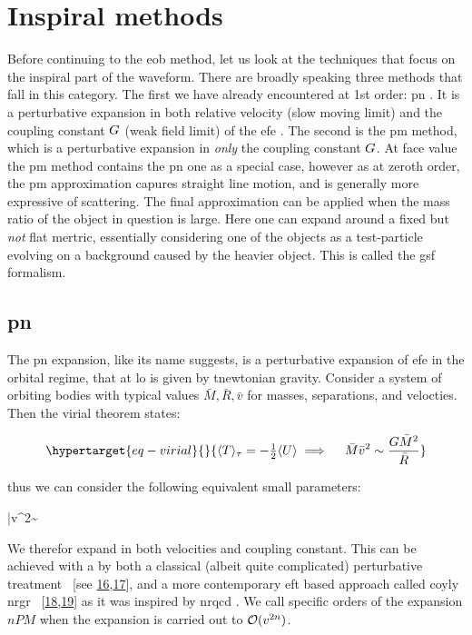 \documentclass[
  10pt,
  a4paper,
  DIV=11,
  numbers=noendperiod,
  oneside]{scrreprt}
\let\[\relax \let\]\relax %
\DeclareRobustCommand{\[}{\begin{equation}}
\DeclareRobustCommand{\]}{\end{equation}}
\begin{document}
\hypertarget{inspiral-methods}{%
\section{Inspiral methods}\label{inspiral-methods}}

Before continuing to the \gls{eob} method, let us look at the techniques
that focus on the inspiral part of the waveform. There are broadly
speaking three methods that fall in this category. The first we have
already encountered at 1st order: \gls{pn} . It is a perturbative
expansion in both relative velocity (slow moving limit) and the coupling
constant \(\grav\) (weak field limit) of the \gls{efe} . The second is
the \gls{pm} method, which is a perturbative expansion in \emph{only}
the coupling constant \(\grav\). At face value the \gls{pm} method
contains the \gls{pn} one as a special case, however as at zeroth order,
the \gls{pm} approximation capures straight line motion, and is
generally more expressive of scattering. The final approximation can be
applied when the mass ratio of the object in question is large. Here one
can expand around a fixed but \emph{not} flat mertric, essentially
considering one of the objects as a test-particle evolving on a
background caused by the heavier object. This is called the \gls{gsf}
formalism.

\hypertarget{pn}{%
\subsection{\texorpdfstring{\gls{pn}}{}}\label{pn}}

The \gls{pn} expansion, like its name suggests, is a perturbative
expansion of \gls{efe} in the orbital regime, that at \gls{lo} is given
by tnewtonian gravity. Consider a system of orbiting bodies with typical
values \(\bar{M},\bar{R},\bar{v}\) for masses, separations, and
velocties. Then the virial theorem states:

\begin{equation}\protect\hypertarget{eq-virial}{}{
\ang{T}_\tau=-\half \ang{U} \implies \quad \bar{M} \bar{v}^2\sim \frac{G \bar{M}^2}{\bar{R}}
}\label{eq-virial}\end{equation}

thus we can consider the following equivalent small parameters:

\[
\bar{v}^2\sim {}
\]

We therefor expand in both velocities and coupling constant. This can be
achieved with a by both a classical (albeit quite complicated)
perturbative treatment ~{[}see
\protect\hyperlink{ref-Blanchet:2013haa}{16},\protect\hyperlink{ref-Blanchet:1995fg}{17}{]},
and a more contemporary \gls{eft} based approach called coyly \gls{nrgr}
~{[}\protect\hyperlink{ref-Goldberger:2004jt}{18},\protect\hyperlink{ref-Sturani:2021xpq}{19}{]}
as it was inspired by \gls{nrqcd} . We call specific orders of the
expansion \(nPM\) when the expansion is carried out to
\(\order[2n]{v}\).
\end{document}
